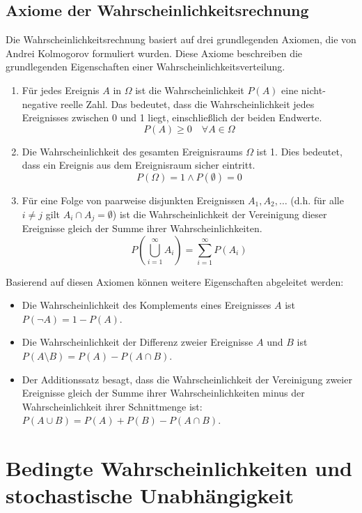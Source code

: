 \subsection{Axiome der Wahrscheinlichkeitsrechnung}
Die Wahrscheinlichkeitsrechnung basiert auf drei grundlegenden Axiomen, die von Andrei Kolmogorov formuliert wurden.
Diese Axiome beschreiben die grundlegenden Eigenschaften einer Wahrscheinlichkeitsverteilung.

\begin{enumerate}
    \item Für jedes Ereignis $A$ in $\Omega$ ist die Wahrscheinlichkeit $P(A)$ eine nicht-negative reelle Zahl. Das bedeutet, dass die Wahrscheinlichkeit jedes Ereignisses zwischen 0 und 1 liegt, einschließlich der beiden Endwerte.
    \[P(A) \geq 0 \quad \forall A \in \Omega\]

    \item Die Wahrscheinlichkeit des gesamten Ereignisraums $\Omega$ ist 1. Dies bedeutet, dass ein Ereignis aus dem Ereignisraum sicher eintritt.
    \[P(\Omega) = 1 \land P(\emptyset) = 0\]

    \item Für eine Folge von paarweise disjunkten Ereignissen $A_1, A_2, \dots$ (d.h. für alle $i \neq j$ gilt $A_i \cap A_j = \emptyset$) ist die Wahrscheinlichkeit der Vereinigung dieser Ereignisse gleich der Summe ihrer Wahrscheinlichkeiten.
    \[P\left(\bigcup_{i=1}^{\infty} A_i \right) = \sum_{i=1}^{\infty} P(A_i)\]
\end{enumerate}
\newline \newline
Basierend auf diesen Axiomen können weitere Eigenschaften abgeleitet werden:
\begin{itemize}
    \item Die Wahrscheinlichkeit des Komplements eines Ereignisses $A$ ist $P(\neg A) = 1 - P(A)$.
    \item Die Wahrscheinlichkeit der Differenz zweier Ereignisse $A$ und $B$ ist $P(A \setminus B) = P(A) - P(A \cap B)$.
    \item Der Additionssatz besagt, dass die Wahrscheinlichkeit der Vereinigung zweier Ereignisse gleich der Summe ihrer Wahrscheinlichkeiten minus der Wahrscheinlichkeit ihrer Schnittmenge ist: $P(A \cup B) = P(A) + P(B) - P(A \cap B)$.
\end{itemize}


\section{Bedingte Wahrscheinlichkeiten und stochastische Unabhängigkeit}

